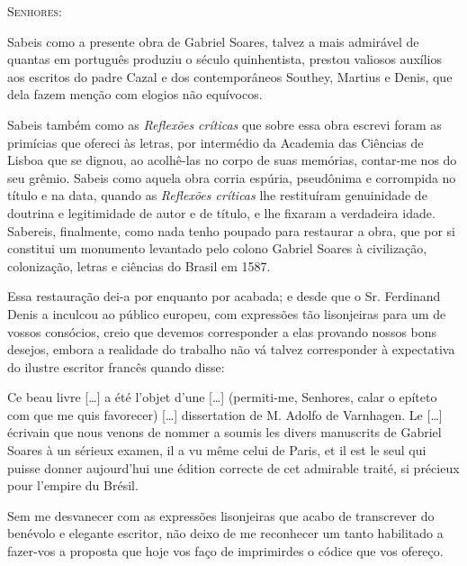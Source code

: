 \textsc{Senhores:}

Sabeis como a presente obra de Gabriel Soares, talvez a mais admirável 
de quantas em português produziu o século quinhentista, 
prestou valiosos auxílios aos escritos do padre Cazal e dos 
contemporâneos Southey, Martius e Denis, que dela fazem menção com 
elogios não equívocos. 

Sabeis também como as \textit{Reflexões críticas} que sobre essa obra 
escrevi foram as primícias que ofereci às letras, por intermédio da 
Academia das Ciências de Lisboa que se dignou, ao acolhê-las no corpo 
de suas memórias, contar-me nos do seu grêmio. Sabeis como aquela obra corria espúria, pseudônima e corrompida no título e na data, quando 
as \textit{Reflexões críticas} lhe restituíram genuinidade de doutrina e    
legitimidade de autor e de título, e lhe fixaram a verdadeira idade. 
Sabereis, finalmente, como nada tenho poupado para restaurar a obra, 
que por si constitui um monumento levantado pelo colono Gabriel 
Soares à civilização, colonização, letras e ciências do Brasil em 1587.

Essa restauração dei-a por enquanto por acabada; e desde que o Sr. 
Ferdinand Denis a inculcou ao público europeu, com expressões tão 
lisonjeiras para um de vossos consócios, creio que devemos 
corresponder a elas provando nossos bons desejos, embora a realidade 
do trabalho não vá talvez corresponder à expectativa do ilustre escritor 
francês quando disse: 

\begin{hedraquote}
Ce beau livre [\ldots] a été l'objet d'une [\ldots] 
(permiti-me, Senhores, calar o epíteto com que me quis favorecer) [\ldots] 
dissertation de M. Adolfo de Varnhagen. Le [\ldots] écrivain que nous 
venons de nommer a soumis les divers manuscrits de Gabriel Soares à un 
sérieux examen, il a vu même celui de Paris, et il est le seul qui puisse
donner aujourd'hui une édition correcte de cet admirable traité, si 
précieux pour l'empire du Brésil.
\end{hedraquote}

Sem me desvanecer com as expressões lisonjeiras que acabo de 
transcrever do benévolo e elegante escritor, não deixo de me reconhecer 
um tanto habilitado a fazer-vos a proposta que hoje vos faço de 
imprimirdes o códice que vos ofereço.

